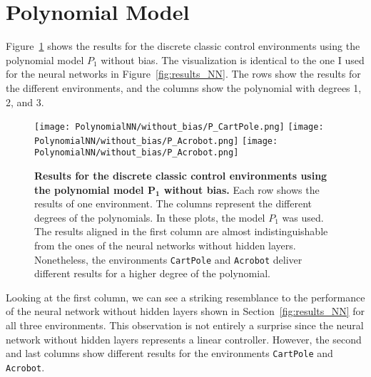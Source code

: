 \section{Polynomial Model}
Figure~\ref{fig:results_Polynomial} shows the results for the discrete classic control environments using the polynomial model $P_1$ without bias. The visualization is identical to the one I used for the neural networks in Figure~\ref{fig:results_NN}. The rows show the results for the different environments, and the columns show the polynomial with degrees 1, 2, and 3.
\begin{figure}[!ht]
  \centering
  \texttt{[image: PolynomialNN/without\_bias/P\_CartPole.png]}
  \texttt{[image: PolynomialNN/without\_bias/P\_Acrobot.png]}
  \texttt{[image: PolynomialNN/without\_bias/P\_Acrobot.png]}
\caption[Results for the discrete classic control environments using the polynomial model $\mathbf{P_1}$ without bias]{
  \textbf{Results for the discrete classic control environments using the polynomial model $\mathbf{P_1}$ without bias.}
   Each row shows the results of one environment. The columns represent the different degrees of the polynomials. In these plots, the model $P_1$ was used. The results aligned in the first column are almost indistinguishable from the ones of the neural networks without hidden layers. Nonetheless, the environments \texttt{CartPole} and \texttt{Acrobot} deliver different results for a higher degree of the polynomial.
}
\label{fig:results_Polynomial}
\end{figure}
Looking at the first column, we can see a striking resemblance to the performance of the neural network without hidden layers shown in Section~\ref{fig:results_NN} for all three environments. This observation is not entirely a surprise since the neural network without hidden layers represents a linear controller. However, the second and last columns show different results for the environments \verb|CartPole| and \verb|Acrobot|.

